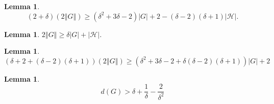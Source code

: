 \documentclass[12pt]{article}
\theoremstyle{plain}
\newtheorem{lem}[thm]{Lemma}
\theoremstyle{definition}
\theoremstyle{remark}
\newcommand{\fancy}[1]{\mathcal{#1}}
\newcommand{\HH}{\fancy{H}}
\newcommand{\card}[1]{\left|#1\right|}
\newcommand{\size}[1]{\left\Vert#1\right\Vert}
\begin{document}
\begin{lem}
	\[(2 + \delta)(2\size{G}) \ge (\delta^2 + 3\delta - 2)\card{G} + 2 - (\delta - 2)(\delta + 1)\card{\HH}.\]
\end{lem}

\begin{lem}
	$2\size{G} \ge \delta\card{G} + \card{\HH}$.
\end{lem}

\begin{lem}
	\[(\delta + 2 + (\delta - 2)(\delta+1))(2\size{G}) \ge (\delta^2 + 3\delta - 2 + \delta(\delta - 2)(\delta+1))\card{G} + 2\]
\end{lem}


\begin{lem}
	\[d(G) > \delta + \frac{1}{\delta} - \frac{2}{\delta^2}\]
\end{lem}





\end{document}

